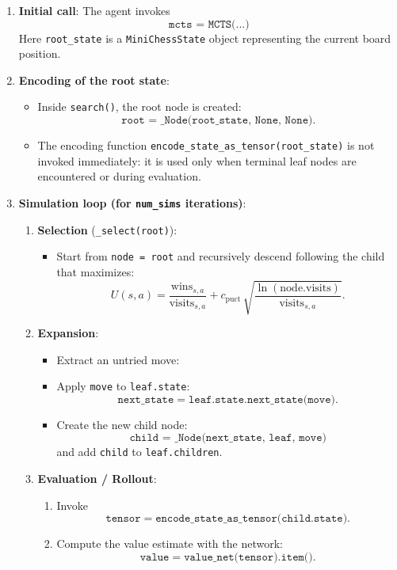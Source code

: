 \documentclass{report}
\begin{document}
\begin{enumerate}
  \item \textbf{Initial call}: The agent invokes  
    \[
      \texttt{mcts = MCTS(...)}
    \]
    Here \texttt{root\_state} is a \texttt{MiniChessState} object representing the current board position.

  \item \textbf{Encoding of the root state}:
    \begin{itemize}
      \item Inside \texttt{search()}, the root node is created:  
        \[
          \texttt{root = \_Node(root\_state, None, None).}
        \]
      \item The encoding function \texttt{encode\_state\_as\_tensor(root\_state)} is not invoked immediately: it is used only when terminal leaf nodes are encountered or during evaluation.
    \end{itemize}

  \item \textbf{Simulation loop (for \texttt{num\_sims} iterations)}:
    \begin{enumerate}
      \item \textbf{Selection} (\texttt{\_select(root)}):
        \begin{itemize}
          \item Start from \texttt{node = root} and recursively descend following the child that maximizes:
            \[
              U(s,a) = \frac{\text{wins}_{s,a}}{\text{visits}_{s,a}} + c_{\text{puct}} \,\sqrt{\frac{\ln(\text{node.visits})}{\text{visits}_{s,a}}}.
            \]
        \end{itemize}

      \item \textbf{Expansion}:
        \begin{itemize}
          \item Extract an untried move:  
          \item Apply \texttt{move} to \texttt{leaf.state}:  
            \[
              \texttt{next\_state} = \texttt{leaf.state.next\_state(move)}.
            \]
          \item Create the new child node:  
            \[
              \texttt{child = \_Node(next\_state, leaf, move)} 
            \]  
            and add \texttt{child} to \texttt{leaf.children}.
        \end{itemize}

      \item \textbf{Evaluation / Rollout}:
            \begin{enumerate}
              \item Invoke  
                \[
                  \texttt{tensor} = \texttt{encode\_state\_as\_tensor(child.state)}.
                \]
             \item Compute the value estimate with the network:
                \[
                  \texttt{value} = \texttt{value\_net(tensor).item()}.
                \]
            \end{enumerate}


\end{enumerate}
\end{enumerate}
\end{document}
